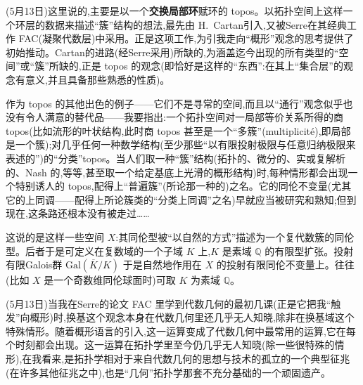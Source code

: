 
(5月13日)这里说的,主要是以一个\textbf{交换局部环}赋环的 topos。以拓扑空间上这样一个环层的数据来描述“簇”结构的想法,最先由 H.~Cartan引入,又被Serre在其经典工作 FAC(凝聚代数层)中采用。正是这项工作,为引我走向“概形”观念的思考提供了初始推动。Cartan的进路(经Serre采用)所缺的,为涵盖迄今出现的所有类型的“空间”或“簇”所缺的,正是 topos 的观念(即恰好是这样的“东西”:在其上“集合层”的观念有意义,并且具备那些熟悉的性质)。


\dmark{}作为 topos 的其他出色的例子——它们不是寻常的空间,而且以“通行”观念似乎也没有令人满意的替代品——我要指出:一个拓扑空间对一局部等价关系所得的商 topos(比如流形的叶状结构,此时商 topos 甚至是一个“多簇”(multiplicité),即局部是一个簇);对几乎任何一种数学结构(至少那些“以有限投射极限与任意归纳极限来表述的”)的“分类”topos。当人们取一种“簇”结构(拓扑的、微分的、实或复解析的、Nash 的,等等,甚至取一个给定基底上光滑的概形结构)时,每种情形都会出现一个特别诱人的 topos,配得上“普遍簇”(所论那一种的)之名。它的同伦不变量(尤其它的上同调——配得上所论簇类的“分类上同调”之名)早就应当被研究和熟知;但到现在,这条路还根本没有被走过……


这说的是这样一些空间 $X$:其同伦型被“以自然的方式”描述为一个复代数簇的同伦型。后者于是可定义在复数域的一个子域 $K$ 上,$K$ 是素域 $\mathbb{Q}$ 的有限型扩张。投射有限Galois群 $\mathrm{Gal}(\overline{K}/K)$ 于是自然地作用在 $X$ 的投射有限同伦不变量上。往往(比如 $X$ 是一个奇数维同伦球面时)可取 $K$ 为素域 $\mathbb{Q}$。


(5月13日)当我在Serre的论文 FAC 里学到代数几何的最初几课(正是它把我“触发”向概形)时,换基这个观念本身在代数几何里还几乎无人知晓,除非在换基域这个特殊情形。随着概形语言的引入,这一运算变成了代数几何中最常用的运算,它在每个时刻都会出现。这一运算在拓扑学里至今仍几乎无人知晓(除一些很特殊的情形),在我看来,是拓扑学相对于来自代数几何的思想与技术的孤立的一个典型征兆(在许多其他征兆之中),也是“几何”拓扑学那套不充分基础的一个顽固遗产。


